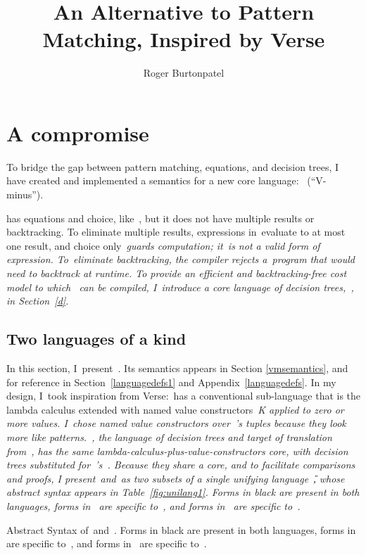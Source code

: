 \documentclass[manuscript,screen 12pt, nonacm]{acmart}
\title{An Alternative to Pattern Matching, Inspired by Verse}
\author{Roger Burtonpatel}
\affiliation{%
\institution{Tufts University}
\streetaddress{419 Boston Ave}
  \city{Medford}
  \state{Massachusetts}
  \country{USA}
  \postcode{02155}
  }
\begin{document}
  
\section{A compromise}
\label{compromise}
    
    To bridge the gap between pattern matching, equations, and decision trees, I
    have created and implemented a semantics for a new core language:~\VMinus
     (``V-minus''). 
    
    \VMinus has equations and choice, like~\VC, but it does not have multiple results or
    backtracking. To eliminate multiple results, expressions in~\VMinus evaluate
    to at most one result, and choice only~\it{guards} computation; it~is not a
    valid form of expression. To~eliminate backtracking, the
    compiler rejects a~\VMinus program that would need to backtrack at runtime.
    To provide an efficient and backtracking-free cost model to which~\VMinus
    can be compiled, I~introduce a core language of decision trees,~\D,
    in Section~\ref{d}. 

    \subsection{Two languages of a kind}
    
    In this section, I~present~\VMinus. Its semantics appears in Section
    \ref{vmsemantics}, and for reference in Section~\ref{languagedefs1} and
    Appendix~\ref{languagedefs}. In my design, I~took inspiration from
    Verse:~\VMinus has a conventional sub-language that is the lambda calculus
    extended with named value constructors~\it{K} applied to zero or more
    values. I~chose named value constructors over~\VC's tuples because they look
    more like patterns.~\D, the language of decision trees and target of
    translation from~\VMinus, has the same
    lambda-calculus-plus-value-constructors core, with decision trees
    substituted for~\VMinus's~\iffibf. Because they share a core, and to
    facilitate comparisons and proofs, I present~\VMinus and~\D as two subsets
    of a single unifying language~\U, whose abstract syntax appears in
    Table~\ref{fig:unilang1}. Forms in black are present in both languages,
    forms in~ are specific to~\VMinus, and forms in~ are
    specific to~\D. 

    \begin{table}[ht]
      \utable
      \caption{Abstract Syntax of~\VMinus and~\D. Forms in black are present in
              both languages, forms in~ are specific to~\VMinus, and
              forms in~ are specific to~\D.}
      \label{fig:unilang1}
    \end{table}
\end{document}
